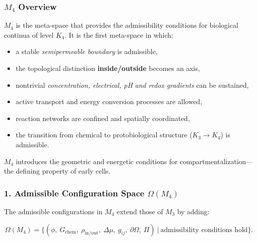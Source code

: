 

\subsubsection{\texorpdfstring{$M_4$}{M_4} Overview}
\label{sec:m4-overview}

$M_4$ is the meta-space that provides the admissibility conditions for
biological continua of level $K_4$.
It is the first meta-space in which:

\begin{itemize}
    \item a stable \emph{semipermeable boundary} is admissible,
    \item the topological distinction \textbf{inside/outside} becomes an axis,
    \item nontrivial \emph{concentration, electrical, pH and redox gradients}
    can be sustained,
    \item active transport and energy conversion processes are allowed,
    \item reaction networks are confined and spatially coordinated,
    \item the transition from chemical to protobiological structure ($K_3 \to K_4$)
          is admissible.
\end{itemize}

$M_4$ introduces the geometric and energetic conditions for
compartmentalization---the defining property of early cells.

\subsubsection*{1. Admissible Configuration Space \texorpdfstring{$\Omega(M_4)$}{\Omega(M_4)}}

The admissible configurations in $M_4$ extend those of $M_3$ by adding:

\[
\Omega(M_4)
=
\Big\{
(\phi,\ G_{\mathrm{chem}},\ \rho_{\mathrm{in/out}},\
\Delta\mu,\ g_{ij},\ \partial\Omega,\ \Pi)
\ \Big|\ \text{admissibility conditions hold}
\Big\}.
\]

